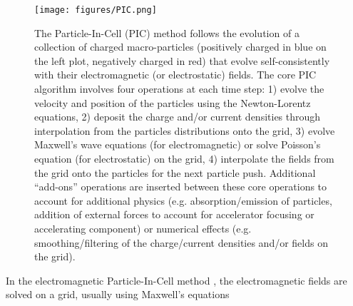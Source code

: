 \documentclass[]{report}
\begin{document}
\begin{figure}
\texttt{[image: figures/PIC.png]}
\caption{\label{fig:PIC} The Particle-In-Cell (PIC) method follows the evolution of a collection of charged macro-particles (positively charged in blue on the left plot, negatively charged in red) that evolve self-consistently with their electromagnetic (or electrostatic) fields. The core PIC algorithm involves four operations at each time step: 1) evolve the velocity and position of the particles using the Newton-Lorentz equations, 2) deposit the charge and/or current densities through interpolation from the particles distributions onto the grid, 3) evolve Maxwell's wave equations (for electromagnetic) or solve Poisson's equation (for electrostatic) on the grid, 4) interpolate the fields from the grid onto the particles for the next particle push. Additional ``add-ons'' operations are inserted between these core operations to account for additional physics (e.g. absorption/emission of particles, addition of external forces to account for accelerator focusing or accelerating component) or numerical effects (e.g. smoothing/filtering of the charge/current densities and/or fields on the grid).}
\end{figure}

In the electromagnetic Particle-In-Cell method \cite{BirdsallLangdon},
the electromagnetic fields are solved on a grid, usually using Maxwell's
equations
\end{document}
